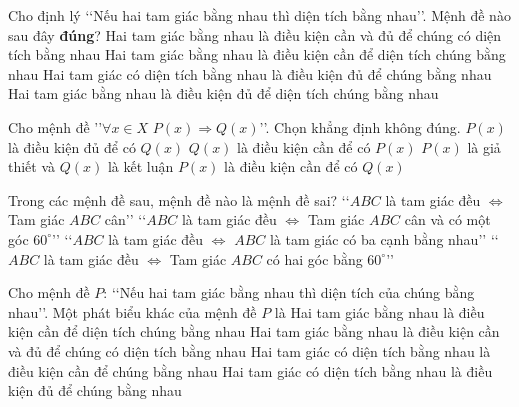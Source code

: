 \begin{ex}%
	Cho định lý \lq\lq Nếu hai  tam giác bằng nhau thì diện tích bằng nhau\rq\rq. Mệnh đề nào sau đây \textbf{đúng}?
	\choice 
		{Hai tam giác bằng  nhau là điều kiện cần và đủ để chúng có diện tích bằng nhau}
		{Hai tam giác bằng  nhau là điều kiện cần để diện tích chúng bằng nhau}
		{Hai tam giác có diện tích bằng nhau là điều kiện  đủ để chúng bằng nhau}
		{\True Hai tam giác  bằng nhau là điều kiện đủ để diện tích chúng bằng nhau}
\end{ex}

\begin{ex}%
	Cho mệnh đề \rq\rq $\forall x \in X$ $P(x) \Rightarrow Q(x)$\rq\rq . Chọn khẳng định không đúng. 
	 \choice
		{$P(x)$ là điều kiện đủ để có  $Q(x)$}
		{$Q(x)$ là điều kiện  cần để có $P(x)$}
		{$P(x)$ là giả thiết  và $Q(x)$ là kết luận}
		{\True $P(x)$ là  điều kiện cần để có $Q(x)$}
\end{ex}

\begin{ex}%
	Trong các mệnh đề sau, mệnh đề nào là mệnh đề sai? 
	 \choice
		{\lq\lq $ABC$ là tam giác đều $\Leftrightarrow$ Tam giác  $ABC$ cân\rq\rq }
		 {\lq\lq $ABC$ là tam giác đều $\Leftrightarrow$ Tam giác $ABC$ cân và có một góc $60^{\circ}$\rq\rq }
		{\lq\lq $ABC$ là tam giác đều $\Leftrightarrow$ $ABC$ là tam giác có  ba cạnh bằng nhau\rq\rq }
		{\True  \lq\lq $ABC$ là tam giác đều $\Leftrightarrow$ Tam giác $ABC$ có hai góc bằng $60^{\circ}$\rq\rq }
\end{ex}

\begin{ex}%
	Cho mệnh đề $P$: \lq\lq Nếu hai tam giác bằng nhau thì diện tích của chúng bằng nhau\rq\rq. Một  phát biểu khác của mệnh đề $P$ là
	 \choice
		{Hai tam giác bằng  nhau là điều kiện cần để diện tích chúng bằng nhau}
		{Hai tam giác bằng nhau là điều kiện cần và đủ để chúng  có diện tích bằng nhau}
		{\True Hai tam giác có diện tích bằng nhau là điều  kiện cần để chúng bằng nhau}
		{Hai tam giác có diện tích bằng nhau là điều  kiện đủ để chúng bằng nhau}
\end{ex}


